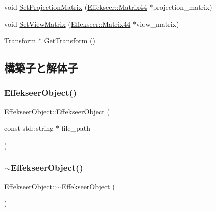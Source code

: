 \begin{DoxyCompactItemize}
\item 
void \mbox{\hyperlink{class_effekseer_object_aa3849f176ccb493b162d08c1ef387996}{Set\+Projection\+Matrix}} (\mbox{\hyperlink{struct_effekseer_1_1_matrix44}{Effekseer\+::\+Matrix44}} $\ast$projection\+\_\+matrix)
\item 
void \mbox{\hyperlink{class_effekseer_object_ac7f3145b79b5e65e45014abd30ee5de8}{Set\+View\+Matrix}} (\mbox{\hyperlink{struct_effekseer_1_1_matrix44}{Effekseer\+::\+Matrix44}} $\ast$view\+\_\+matrix)
\item 
\mbox{\hyperlink{class_transform}{Transform}} $\ast$ \mbox{\hyperlink{class_effekseer_object_ad7e825d08856df48459437ad759d7a00}{Get\+Transform}} ()
\end{DoxyCompactItemize}


\subsection{構築子と解体子}
\mbox{\label{class_effekseer_object_a8e1e081f62efa87b31e00bcfd9cf1a45}} 
\subsubsection{\texorpdfstring{Effekseer\+Object()}{EffekseerObject()}}
{\footnotesize\ttfamily Effekseer\+Object\+::\+Effekseer\+Object (\begin{DoxyParamCaption}\item[{const std\+::string $\ast$}]{file\+\_\+path }\end{DoxyParamCaption})}

\mbox{\label{class_effekseer_object_a0463ba508e3c83576991138465847054}} 
\subsubsection{\texorpdfstring{$\sim$\+Effekseer\+Object()}{~EffekseerObject()}}
{\footnotesize\ttfamily Effekseer\+Object\+::$\sim$\+Effekseer\+Object (\begin{DoxyParamCaption}{ }\end{DoxyParamCaption})\hspace{0.3cm}{\ttfamily [virtual]}}



